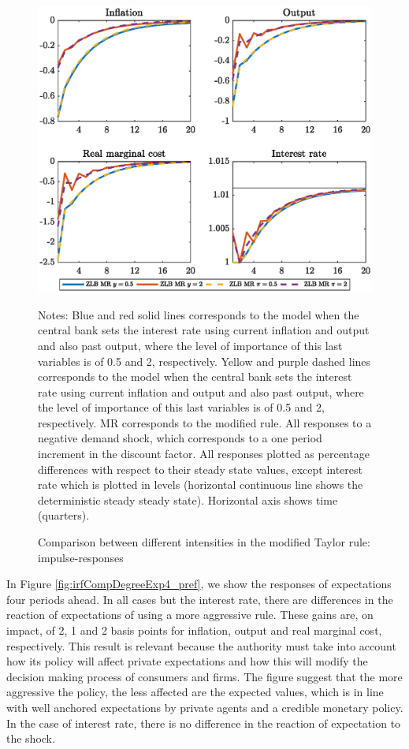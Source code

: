 \documentclass[11pt]{article}
\numberwithin{equation}{section}
\begin{document}
\begin{figure}[H]
	\centering
	\caption{Comparison between different intensities in the modified Taylor rule: impulse-responses}\label{fig:irfCompDegreeLevel_pref}
	\includegraphics[scale=.6]{irfCompDegreeLevel_pref}
	\begin{minipage}{\linewidth}
    	\vspace{1mm}
	\footnotesize{{\sc Notes:} Blue and red solid lines corresponds to the model when the central bank sets the interest rate using current inflation and output and also past output, where the level of importance of this last variables is of 0.5 and 2, respectively. Yellow and purple dashed lines corresponds to the model when the central bank sets the interest rate using current inflation and output and also past output, where the level of importance of this last variables is of 0.5 and 2, respectively. MR corresponds to the modified rule. All responses to a negative demand shock, which corresponds to a one period increment in the discount factor. All responses plotted as percentage differences with respect to their steady state values, except interest rate which is plotted in levels (horizontal continuous line shows the deterministic steady steady state). Horizontal axis shows time (quarters).}
	\end{minipage}
\end{figure}

In Figure \ref{fig:irfCompDegreeExp4_pref}, we show the responses of expectations four periods ahead. In all cases but the interest rate, there are differences in the reaction of expectations of using a more aggressive rule. These gains are, on impact, of 2, 1 and 2 basis points for inflation, output and real marginal cost, respectively. This result is relevant because the authority must take into account how its policy will affect private expectations and how this will modify the decision making process of consumers and firms. The figure suggest that the more aggressive the policy, the less affected are the expected values, which is in line with well anchored expectations by private agents and a credible monetary policy. In the case of interest rate, there is no difference in the reaction of expectation to the shock.
\end{document}
